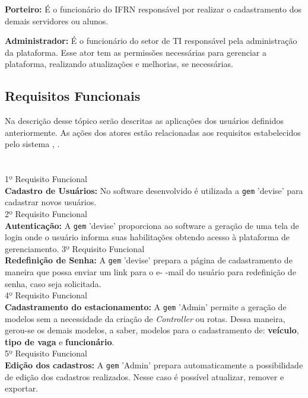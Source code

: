  \textbf{Porteiro:} É o funcionário do IFRN responsável por realizar o cadastramento dos demais servidores ou alunos.
 
 \textbf{Administrador:} É o funcionário do setor de TI responsável pela administração da plataforma. Esse ator tem as permissões necessárias para gerenciar a plataforma, realizando atualizações e melhorias, se necessárias.
 \subsection{ Requisitos Funcionais}
 
 Na descrição desse tópico serão descritas as aplicações dos usuários definidos anteriormente.
As ações dos atores estão relacionadas aos requisitos estabelecidos pelo sistema \cite{SOMMERVILLE}, \cite{pressman2016engenharia}.\\\\\\1º Requisito Funcional\\
 \textbf{Cadastro de Usuários:} No software desenvolvido é utilizada a \texttt{gem} 'devise'  para cadastrar novos usuários.\\
 2º Requisito Funcional\\
 \textbf{Autenticação:}  A  \texttt{gem} 'devise' proporciona ao software a geração de uma tela de login onde o usuário
 informa suas habilitações obtendo acesso à plataforma de gerenciamento.
 3º Requisito Funcional\\
 \textbf{Redefinição de Senha:} A  \texttt{gem} 'devise' prepara a página de cadastramento de maneira que possa  enviar um link para o e-
 -mail do usuário para redefinição de senha, caso seja solicitada.\\
  4º Requisito Funcional\\
 \textbf{Cadastramento do estacionamento:}
 A  \texttt{gem} 'Admin' permite a geração de modelos sem a necessidade da criação de \textit{Controller} ou rotas. Dessa maneira, gerou-se os demais modelos, a saber, modelos para o cadastramento de: \textbf{veículo},
 \textbf{tipo de vaga} e
 \textbf{funcionário}.\\
 5º Requisito Funcional\\
 \textbf{Edição dos cadastros:}  A  \texttt{gem} 'Admin' prepara automaticamente a possibilidade de edição dos cadastros realizados. Nesse caso é possível atualizar, remover e exportar.
 
